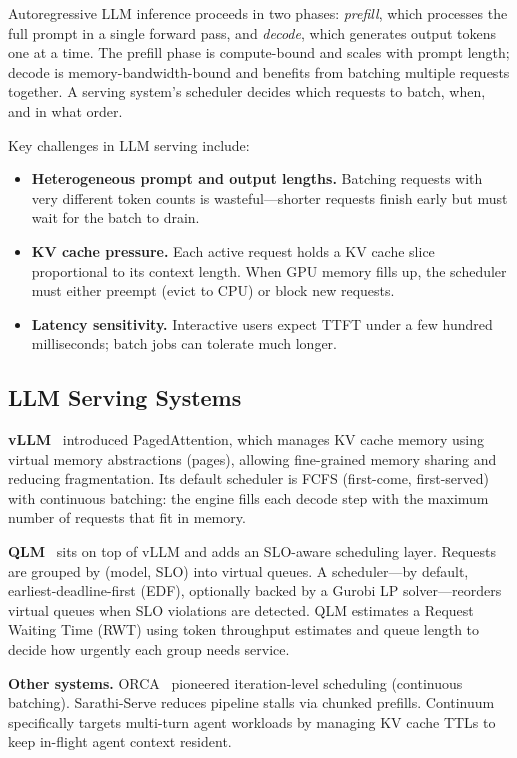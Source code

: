 \documentclass[10pt, twocolumn, letterpaper]{article}
\begin{document}
Autoregressive LLM inference proceeds in two phases: \emph{prefill}, which processes the full prompt in a single forward pass, and \emph{decode}, which generates output tokens one at a time. The prefill phase is compute-bound and scales with prompt length; decode is memory-bandwidth-bound and benefits from batching multiple requests together. A serving system's scheduler decides which requests to batch, when, and in what order.

Key challenges in LLM serving include:
\begin{itemize}
    \item \textbf{Heterogeneous prompt and output lengths.} Batching requests with very different token counts is wasteful---shorter requests finish early but must wait for the batch to drain.
    \item \textbf{KV cache pressure.} Each active request holds a KV cache slice proportional to its context length. When GPU memory fills up, the scheduler must either preempt (evict to CPU) or block new requests.
    \item \textbf{Latency sensitivity.} Interactive users expect TTFT under a few hundred milliseconds; batch jobs can tolerate much longer.
\end{itemize}

\subsection{LLM Serving Systems}

\textbf{vLLM}~\cite{vllm} introduced PagedAttention, which manages KV cache memory using virtual memory abstractions (pages), allowing fine-grained memory sharing and reducing fragmentation. Its default scheduler is FCFS (first-come, first-served) with continuous batching: the engine fills each decode step with the maximum number of requests that fit in memory.

\textbf{QLM}~\cite{qlm} sits on top of vLLM and adds an SLO-aware scheduling layer. Requests are grouped by (model, SLO) into virtual queues. A scheduler---by default, earliest-deadline-first (EDF), optionally backed by a Gurobi LP solver---reorders virtual queues when SLO violations are detected. QLM estimates a Request Waiting Time (RWT) using token throughput estimates and queue length to decide how urgently each group needs service.

\textbf{Other systems.} ORCA~\cite{orca} pioneered iteration-level scheduling (continuous batching). Sarathi-Serve reduces pipeline stalls via chunked prefills. Continuum~\cite{continuum} specifically targets multi-turn agent workloads by managing KV cache TTLs to keep in-flight agent context resident.
\end{document}
